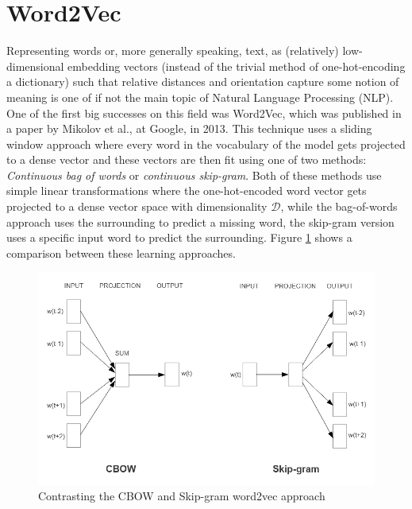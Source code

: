 \documentclass[draft,final]{vutinfth} %
\begin{document}
\section{Word2Vec}
Representing words or, more generally speaking, text, as (relatively) low-dimensional embedding vectors (instead of the trivial method of one-hot-encoding a dictionary) such that relative distances and orientation capture some notion of meaning is one of if not the main topic of Natural Language Processing (NLP). One of the first big successes on this field was Word2Vec, which was published in a paper by Mikolov et al., at Google, in 2013. This technique uses a sliding window approach where every word in the vocabulary of the model gets projected to a dense vector and these vectors are then fit using one of two methods: \textit{Continuous bag of words} or \textit{continuous skip-gram}. Both of these methods use simple linear transformations where the one-hot-encoded word vector gets projected to a dense vector space with dimensionality $\mathcal{D}$, while the bag-of-words approach uses the surrounding to predict a missing word, the skip-gram version uses a specific input word to predict the surrounding. Figure \ref{fig:word2vec} shows a comparison between these learning approaches.
\begin{figure}
    \centering
    \includegraphics[width=0.9\linewidth]{thesis-figures/word2vec.png}
    \caption{Contrasting the CBOW and Skip-gram word2vec approach \cite[p. 5]{word2vec_preprint}}
    \label{fig:word2vec}
\end{figure}
\end{document}
